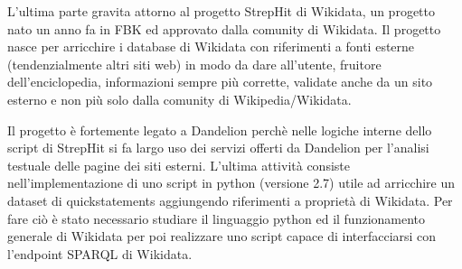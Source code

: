 L'ultima parte gravita attorno al progetto StrepHit di Wikidata, un progetto nato un anno fa in FBK ed approvato dalla comunity di Wikidata. 
Il progetto nasce per arricchire i database di Wikidata con riferimenti a fonti esterne (tendenzialmente altri siti web) in modo da dare all'utente, fruitore dell'enciclopedia, informazioni sempre più corrette,
validate anche da un sito esterno e non più solo dalla comunity di Wikipedia/Wikidata.

Il progetto è fortemente legato a Dandelion perchè nelle logiche interne dello script di StrepHit si fa largo uso dei servizi offerti da Dandelion per l'analisi testuale delle pagine dei siti esterni.
L'ultima attività consiste nell'implementazione di uno script in python (versione 2.7) utile ad arricchire un dataset di quickstatements aggiungendo riferimenti a proprietà di Wikidata.
Per fare ciò è stato necessario studiare il linguaggio python ed il funzionamento generale di Wikidata per poi realizzare uno script capace di interfacciarsi con l'endpoint SPARQL di Wikidata.

